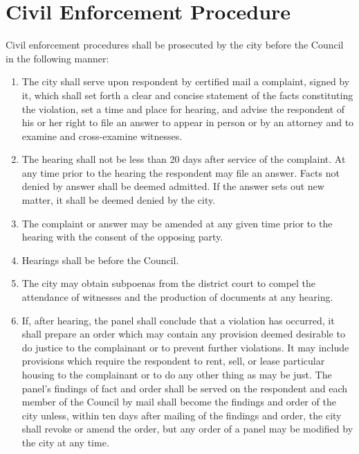 \section{Civil Enforcement Procedure}
Civil enforcement procedures shall be prosecuted by the city before the Council in the following manner:
\begin{enumerate}[{\indent}A)]
    \item The city shall serve upon respondent by certified mail a complaint, signed by it, which shall set forth a clear and concise statement of the facts constituting the violation, set a time and place for hearing, and advise the respondent of his or her right to file an answer to appear in person or by an attorney and to examine and cross-examine witnesses.
    \item The hearing shall not be less than 20 days after service of the complaint.  At any time prior to the hearing the respondent may file an answer.  Facts not denied by answer shall be deemed admitted.  If the answer sets out new matter, it shall be deemed denied by the city.
    \item The complaint or answer may be amended at any given time prior to the hearing with the consent of the opposing party.
    \item Hearings shall be before the Council.
    \item The city may obtain subpoenas from the district court to compel the attendance of witnesses and the production of documents at any hearing.
    \item If, after hearing, the panel shall conclude that a violation has occurred, it shall prepare an order which may contain any provision deemed desirable to do justice to the complainant or to prevent further violations.  It may include provisions which require the respondent to rent, sell, or lease particular housing to the complainant or to do any other thing as may be just.  The panel’s findings of fact and order shall be served on the respondent and each member of the Council by mail shall become the findings and order of the city unless, within ten days after mailing of the findings and order, the city shall revoke or amend the order, but any order of a panel may be modified by the city at any time.
\end{enumerate}
